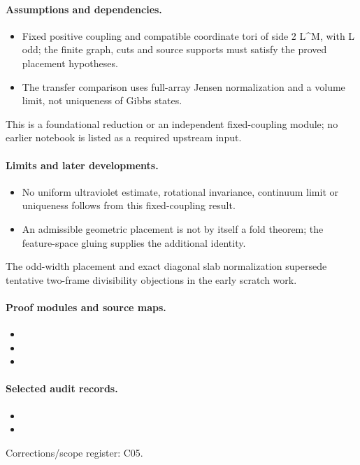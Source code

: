 \documentclass[11pt]{article}
\theoremstyle{remark}
\begin{document}
\paragraph{Assumptions and dependencies.}
\begin{itemize}
\item Fixed positive coupling and compatible coordinate tori of side 2 L\textasciicircum{}M, with L odd; the finite graph, cuts and source supports must satisfy the proved placement hypotheses.
\item The transfer comparison uses full-array Jensen normalization and a volume limit, not uniqueness of Gibbs states.
\end{itemize}

This is a foundational reduction or an independent fixed-coupling module; no earlier notebook is listed as a required upstream input.\par

\paragraph{Limits and later developments.}
\begin{itemize}
\item No uniform ultraviolet estimate, rotational invariance, continuum limit or uniqueness follows from this fixed-coupling result.
\item An admissible geometric placement is not by itself a fold theorem; the feature-space gluing supplies the additional identity.
\end{itemize}

The odd-width placement and exact diagonal slab normalization supersede tentative two-frame divisibility objections in the early scratch work.

\paragraph{Proof modules and source maps.}
\begingroup\small
\begin{itemize}
\item {}
\item {}
\item {}
\end{itemize}
\endgroup

\paragraph{Selected audit records.}
\begingroup\small
\begin{itemize}
\item {}
\item {}
\end{itemize}
\endgroup
Corrections/scope register: C05.\par
\end{document}
